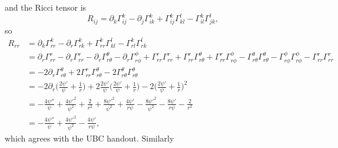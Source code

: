 \documentclass[12pt]{article}
\numberwithin{equation}{section}
\begin{document}
and the Ricci tensor is
\begin{equation}
R_{ij} = \partial_k \Gamma^k_{ij} - \partial_j \Gamma^k_{ik} + \Gamma^k_{ij} \Gamma^l_{kl} - \Gamma^k_{il} \Gamma^l_{jk},
\end{equation}
so
\begin{equation}
\begin{aligned}
R_{rr} &= \partial_k \Gamma^k_{rr} - \partial_r \Gamma^k_{rk} + \Gamma^k_{rr} \Gamma^l_{kl} - \Gamma^k_{rl} \Gamma^l_{rk} \\
&= \partial_r \Gamma^r_{rr} - \partial_r \Gamma^r_{r r} - \partial_r \Gamma^\theta_{r\theta} - \partial_r \Gamma^\phi_{r\phi} + \Gamma^r_{rr} \Gamma^r_{rr} + \Gamma^r_{rr} \Gamma^\theta_{r\theta} + \Gamma^r_{rr} \Gamma^\phi_{r \phi} - \Gamma^\theta_{r\theta} \Gamma^\theta_{r\theta} - \Gamma^\phi_{r \phi} \Gamma^\phi_{r\phi} - \Gamma^r_{rr} \Gamma^r_{rr} \\
&= - 2 \partial_r \Gamma^\theta_{r\theta} + 2 \Gamma^r_{rr} \Gamma^\theta_{r\theta} - 2 \Gamma^\theta_{r\theta} \Gamma^\theta_{r\theta} \\
&= - 2 \partial_r \Big( \frac{2 \psi'}{\psi}  + \frac{1}{r} \Big) + 2 \frac{2 \psi'}{\psi} \Big( \frac{2 \psi'}{\psi}  + \frac{1}{r} \Big) - 2 \Big( \frac{2 \psi'}{\psi}  + \frac{1}{r} \Big)^2 \\
&= - \frac{4 \psi''}{\psi} + \frac{4 \psi'^2}{\psi^2} + \frac{2}{r^2} + \frac{8 \psi'^2}{\psi^2}  + \frac{4 \psi'}{r \psi} - \frac{8 \psi'^2}{\psi^2} - \frac{8 \psi'}{r \psi} - \frac{2}{r^2} \\
&= - \frac{4 \psi''}{\psi} + \frac{4 \psi'^2}{\psi^2} - \frac{4 \psi'}{r \psi},
\end{aligned}
\end{equation}
which agrees with the UBC handout.  Similarly
\end{document}
